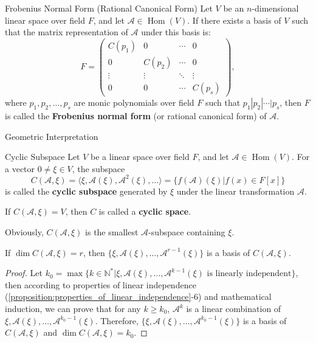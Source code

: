 \documentclass[11pt]{../../TexTemplate/elegantbook} %
\begin{document}
\begin{definition}{Frobenius Normal Form (Rational Canonical Form)}
    Let \( V \) be an \( n \)-dimensional linear space over field \( F \),
    and let \( \mathcal{A}\in \operatorname{Hom}(V) \).
    If there exists a basis of \( V \) such that the matrix representation of \( \mathcal{A} \) under this basis is:
    \[
    F = 
    \begin{pmatrix}
        C(p_1) & 0 & \cdots & 0 \\
        0 & C(p_2) & \cdots & 0 \\
        \vdots & \vdots & \ddots & \vdots \\
        0 & 0 & \cdots & C(p_s)
    \end{pmatrix},
    \]
    where \( p_1, p_2, \dots, p_s \) are monic polynomials over field \( F \) such that
    \( p_1 | p_2 | \cdots | p_s \),
    then \( F \) is called the \textbf{Frobenius normal form} (or rational canonical form) of \( \mathcal{A} \).
\end{definition}

\begin{leftbarTitle}{Geometric Interpretation}\end{leftbarTitle} %
\begin{definition}{Cyclic Subspace}
    Let \( V \) be a linear space over field \( F \),
    and let \( \mathcal{A}\in \operatorname{Hom}(V) \).
    For a vector \(0 \neq \xi \in V \), the subspace
    \[
    C(\mathcal{A}, \xi) = \langle \xi, \mathcal{A}(\xi), \mathcal{A}^{2}(\xi), \ldots \rangle
    = \{ f(\mathcal{A})(\xi) | f(x) \in F[x] \}
    \]
    is called the \textbf{cyclic subspace} generated by \( \xi \) under the linear transformation \( \mathcal{A} \).

    If \(C(\mathcal{A}, \xi) = V\), then \( C \) is called a \textbf{cyclic space}.
\end{definition}
Obviously, \( C(\mathcal{A}, \xi) \) is the smallest \( \mathcal{A} \)-subspace containing \( \xi \).

\begin{property}
    If \(\operatorname{dim} C(\mathcal{A}, \xi) = r\), 
    then \(\{ \xi, \mathcal{A}(\xi), \ldots, \mathcal{A}^{r-1}(\xi) \}\) is a basis of \( C(\mathcal{A}, \xi) \).
\end{property}
\begin{proof}

    Let \(k_{0}=\max \{ k \in \mathbb{N}^{*}|\xi, \mathcal{A}(\xi), \ldots, \mathcal{A}^{k-1}(\xi) 
    \text{ is linearly independent} \}  \),
    then according to properties of linear independence (\ref{proposition:properties_of_linear_independence}-6)
    and mathematical induction, we can prove that
    for any \( k \geqslant k_{0} \), \( \mathcal{A}^{k}\) is a linear combination of
    \( \xi, \mathcal{A}(\xi), \ldots, \mathcal{A}^{k_{0}-1}(\xi) \).
    Therefore, \( \{ \xi, \mathcal{A}(\xi), \ldots, \mathcal{A}^{k_{0}-1}(\xi) \} \) is a basis of \( C(\mathcal{A}, \xi) \)
    and \( \operatorname{dim} C(\mathcal{A}, \xi) = k_{0} \).
\end{proof}
\end{document}
